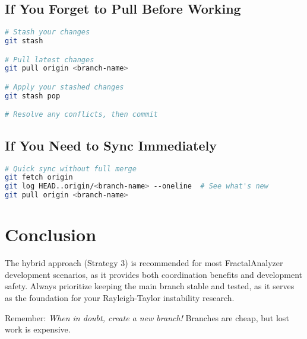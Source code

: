 \documentclass[11pt,letterpaper]{article}
\begin{document}
\subsection{If You Forget to Pull Before Working}
\begin{lstlisting}[language=bash]
# Stash your changes
git stash

# Pull latest changes
git pull origin <branch-name>

# Apply your stashed changes
git stash pop

# Resolve any conflicts, then commit
\end{lstlisting}

\subsection{If You Need to Sync Immediately}
\begin{lstlisting}[language=bash]
# Quick sync without full merge
git fetch origin
git log HEAD..origin/<branch-name> --oneline  # See what's new
git pull origin <branch-name>
\end{lstlisting}

\section{Conclusion}

The hybrid approach (Strategy 3) is recommended for most FractalAnalyzer development scenarios, as it provides both coordination benefits and development safety. Always prioritize keeping the main branch stable and tested, as it serves as the foundation for your Rayleigh-Taylor instability research.

Remember: \textit{When in doubt, create a new branch!} Branches are cheap, but lost work is expensive.
\end{document}
